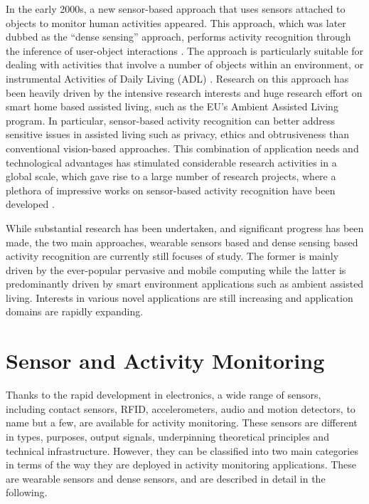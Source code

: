 In the early 2000s, a new sensor-based approach that uses sensors attached to objects to monitor human activities appeared. This approach, which was later dubbed as the “dense sensing” approach, performs activity recognition through the inference of user-object interactions \cite{Bao2004} \cite{Patterson2003}. The approach is particularly suitable for dealing with activities that involve a number of objects within an environment, or instrumental Activities of Daily Living (ADL) \cite{Chan2008} \cite{Nugent2009}. Research on this approach has been heavily driven by the intensive research interests and huge research effort on smart home based assisted living, such as the EU’s Ambient Assisted Living program. In particular, sensor-based activity recognition can better address sensitive issues in assisted living such as privacy, ethics and obtrusiveness than conventional vision-based approaches. This combination of application needs and technological advantages has stimulated considerable research activities in a global scale, which gave rise to a large number of research projects, where a plethora of impressive works on sensor-based activity recognition have been developed \cite{Kern2003}  \cite{Mantyjarvi2001} \cite{Philipose2004} \cite{Patterson2005} \cite{Buettner2009} \cite{Wren2006} \cite{Gu2009} \cite{Patterson2003} \cite{Liao2007}.

While substantial research has been undertaken, and significant progress has been made, the two main approaches, wearable sensors based and dense sensing based activity recognition are currently still focuses of study. The former is mainly driven by the ever-popular pervasive and mobile computing while the latter is predominantly driven by smart environment applications such as ambient assisted living. Interests in various novel applications are still increasing and application domains are rapidly expanding.

\section{Sensor and Activity Monitoring}
\label{sec:soa:monitoring}

Thanks to the rapid development in electronics, a wide range of sensors, including contact sensors, RFID, accelerometers, audio and motion detectors, to name but a few, are available for activity monitoring. These sensors are different in types, purposes, output signals, underpinning theoretical principles and technical infrastructure. However, they can be classified into two main categories in terms of the way they are deployed in activity monitoring applications. These are wearable sensors and dense sensors, and are described in detail in the following.


